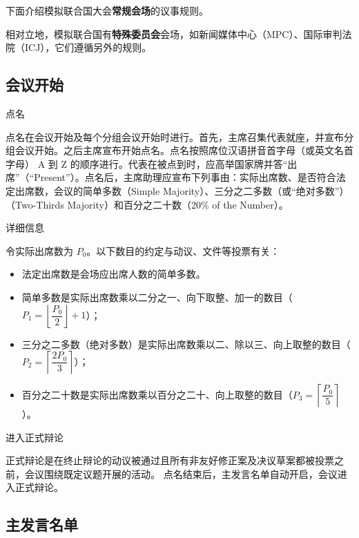 \documentclass{beamer}
\begin{document}
\begin{frame}{}

下面介绍模拟联合国大会\textbf{常规会场}的议事规则。

相对立地，模拟联合国有\textbf{特殊委员会}会场，如新闻媒体中心（MPC）、国际审判法院（ICJ），它们遵循另外的规则。

\end{frame}

\subsection{会议开始}

\begin{frame}{点名}

点名在会议开始及每个分组会议开始时进行。首先，主席召集代表就座，并宣布分组会议开始。之后主席宣布开始点名。点名按照席位汉语拼音首字母（或英文名首字母） A 到 Z 的顺序进行。代表在被点到时，应高举国家牌并答“出席”（“Present”）。点名后，主席助理应宣布下列事由：实际出席数、是否符合法定出席数，会议的简单多数（Simple Majority）、三分之二多数（或“绝对多数”）（Two-Thirds Majority）和百分之二十数（20\% of the Number）。

\end{frame}

\begin{frame}{详细信息}

令实际出席数为 $P_0$。以下数目的约定与动议、文件等投票有关：

\begin{itemize}
\item 法定出席数是会场应出席人数的简单多数。
\item 简单多数是实际出席数乘以二分之一、向下取整、加一的数目（$P_1 = 
\left\lfloor \dfrac{P_0}{2} \right\rfloor + 1$）；
\item 三分之二多数（绝对多数）是实际出席数乘以二、除以三、向上取整的数目（$P_2 = \left\lceil \dfrac{2P_0}{3} \right\rceil$）；
\item 百分之二十数是实际出席数乘以百分之二十、向上取整的数目（$P_3 = \left\lceil \dfrac{P_0}{5} \right\rceil$）。
\end{itemize}

\end{frame}

\begin{frame}{进入正式辩论}

正式辩论是在终止辩论的动议被通过且所有非友好修正案及决议草案都被投票之前，会议围绕既定议题开展的活动。
点名结束后，主发言名单自动开启，会议进入正式辩论。

\subsection{主发言名单}

\end{frame}
\end{document}
